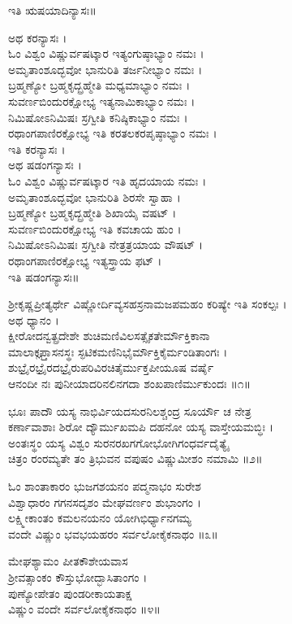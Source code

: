 ಇತಿ ಋಷಯಾದಿನ್ಯಾಸಃ॥

ಅಥ ಕರನ್ಯಾಸಃ ।\\
ಓಂ ವಿಶ್ವಂ ವಿಷ್ಣುರ್ವಷಟ್ಕಾರ ಇತ್ಯಂಗುಷ್ಠಾಭ್ಯಾಂ ನಮಃ ।\\
ಅಮೃತಾಂಶೂದ್ಭವೋ ಭಾನುರಿತಿ ತರ್ಜನೀಭ್ಯಾಂ ನಮಃ ।\\
ಬ್ರಹ್ಮಣ್ಯೋ ಬ್ರಹ್ಮಕೃದ್ಬ್ರಹ್ಮೇತಿ ಮಧ್ಯಮಾಭ್ಯಾಂ ನಮಃ ।\\
ಸುವರ್ಣಬಿಂದುರಕ್ಷೋಭ್ಯ ಇತ್ಯನಾಮಿಕಾಭ್ಯಾಂ ನಮಃ ।\\
ನಿಮಿಷೋಽನಿಮಿಷಃ ಸ್ರಗ್ವೀತಿ ಕನಿಷ್ಠಿಕಾಭ್ಯಾಂ ನಮಃ ।\\
ರಥಾಂಗಪಾಣಿರಕ್ಷೋಭ್ಯ ಇತಿ ಕರತಲಕರಪೃಷ್ಠಾಭ್ಯಾಂ ನಮಃ ।\\
ಇತಿ ಕರನ್ಯಾಸಃ ।\\
ಅಥ ಷಡಂಗನ್ಯಾಸಃ ।\\
ಓಂ ವಿಶ್ವಂ ವಿಷ್ಣುರ್ವಷಟ್ಕಾರ ಇತಿ ಹೃದಯಾಯ ನಮಃ ।\\
ಅಮೃತಾಂಶೂದ್ಭವೋ ಭಾನುರಿತಿ ಶಿರಸೇ ಸ್ವಾಹಾ ।\\
ಬ್ರಹ್ಮಣ್ಯೋ ಬ್ರಹ್ಮಕೃದ್ಬ್ರಹ್ಮೇತಿ ಶಿಖಾಯೈ ವಷಟ್ ।\\
ಸುವರ್ಣಬಿಂದುರಕ್ಷೋಭ್ಯ ಇತಿ ಕವಚಾಯ ಹುಂ ।\\
ನಿಮಿಷೋಽನಿಮಿಷಃ ಸ್ರಗ್ವೀತಿ ನೇತ್ರತ್ರಯಾಯ ವೌಷಟ್ ।\\
ರಥಾಂಗಪಾಣಿರಕ್ಷೋಭ್ಯ ಇತ್ಯಸ್ತ್ರಾಯ ಫಟ್ ।\\
ಇತಿ ಷಡಂಗನ್ಯಾಸಃ॥

ಶ್ರೀಕೃಷ್ಣಪ್ರೀತ್ಯರ್ಥೇ ವಿಷ್ಣೋರ್ದಿವ್ಯಸಹಸ್ರನಾಮಜಪಮಹಂ ಕರಿಷ್ಯೇ ಇತಿ ಸಂಕಲ್ಪಃ ।\\
ಅಥ ಧ್ಯಾನಂ ।\\
ಕ್ಷೀರೋದನ್ವತ್ಪ್ರದೇಶೇ ಶುಚಿಮಣಿವಿಲಸತ್ಸೈಕತೇರ್ಮೌಕ್ತಿಕಾನಾ\\
ಮಾಲಾಕೢಪ್ತಾಸನಸ್ಥಃ ಸ್ಫಟಿಕಮಣಿನಿಭೈರ್ಮೌಕ್ತಿಕೈರ್ಮಂಡಿತಾಂಗಃ ।\\
ಶುಭ್ರೈರಭ್ರೈರದಭ್ರೈರುಪರಿವಿರಚಿತೈರ್ಮುಕ್ತಪೀಯೂಷ ವರ್ಷೈ\\
ಆನಂದೀ ನಃ ಪುನೀಯಾದರಿನಲಿನಗದಾ ಶಂಖಪಾಣಿರ್ಮುಕುಂದಃ ॥೧॥

ಭೂಃ ಪಾದೌ ಯಸ್ಯ ನಾಭಿರ್ವಿಯದಸುರನಿಲಶ್ಚಂದ್ರ ಸೂರ್ಯೌ ಚ ನೇತ್ರ\\
ಕರ್ಣಾವಾಶಾಃ ಶಿರೋ ದ್ಯೌರ್ಮುಖಮಪಿ ದಹನೋ ಯಸ್ಯ ವಾಸ್ತೇಯಮಬ್ಧಿಃ ।\\
ಅಂತಃಸ್ಥಂ ಯಸ್ಯ ವಿಶ್ವಂ ಸುರನರಖಗಗೋಭೋಗಿಗಂಧರ್ವದೈತ್ಯೈ\\
ಚಿತ್ರಂ ರಂರಮ್ಯತೇ ತಂ ತ್ರಿಭುವನ ವಪುಷಂ ವಿಷ್ಣುಮೀಶಂ ನಮಾಮಿ ॥೨॥

ಓಂ ಶಾಂತಾಕಾರಂ ಭುಜಗಶಯನಂ ಪದ್ಮನಾಭಂ ಸುರೇಶ\\
ವಿಶ್ವಾಧಾರಂ ಗಗನಸದೃಶಂ ಮೇಘವರ್ಣಂ ಶುಭಾಂಗಂ ।\\
ಲಕ್ಷ್ಮೀಕಾಂತಂ ಕಮಲನಯನಂ ಯೋಗಿಭಿರ್ಧ್ಯಾನಗಮ್ಯ\\
ವಂದೇ ವಿಷ್ಣುಂ ಭವಭಯಹರಂ ಸರ್ವಲೋಕೈಕನಾಥಂ ॥೩॥

ಮೇಘಶ್ಯಾಮಂ ಪೀತಕೌಶೇಯವಾಸ\\
ಶ್ರೀವತ್ಸಾಂಕಂ ಕೌಸ್ತುಭೋದ್ಭಾಸಿತಾಂಗಂ ।\\
ಪುಣ್ಯೋಪೇತಂ ಪುಂಡರೀಕಾಯತಾಕ್ಷ\\
ವಿಷ್ಣುಂ ವಂದೇ ಸರ್ವಲೋಕೈಕನಾಥಂ ॥೪॥

